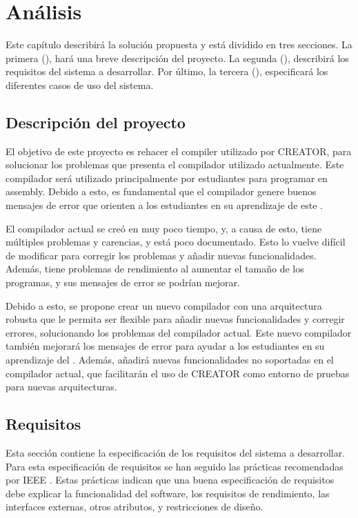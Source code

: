 \chapter{Análisis}\label{chap:analysis}

Este capítulo describirá la solución propuesta y está dividido en tres
secciones. La primera (), hará una breve descripción del
proyecto. La segunda (), describirá los requisitos del
sistema a desarrollar. Por último, la tercera (),
especificará los diferentes casos de uso del sistema.

\section{Descripción del proyecto}\label{sec:description}

El objetivo de este proyecto es rehacer el \gls{compiler} utilizado por CREATOR,
para solucionar los problemas que presenta el compilador utilizado actualmente.
Este compilador será utilizado principalmente por estudiantes para programar en
\gls{assembly}. Debido a esto, es fundamental que el compilador genere buenos
mensajes de error que orienten a los estudiantes en su aprendizaje de este
.

El compilador actual se creó en muy poco tiempo, y, a causa de esto, tiene
múltiples problemas y carencias, y está poco documentado. Esto lo vuelve difícil
de modificar para corregir los problemas y añadir nuevas funcionalidades.
Además, tiene problemas de rendimiento al aumentar el tamaño de los programas,
y sus mensajes de error se podrían mejorar.

Debido a esto, se propone crear un nuevo compilador con una arquitectura robusta
que le permita ser flexible para añadir nuevas funcionalidades y corregir
errores, solucionando los problemas del compilador actual. Este nuevo compilador
también mejorará los mensajes de error para ayudar a los estudiantes en su
aprendizaje del . Además, añadirá nuevas
funcionalidades no soportadas en el compilador actual, que facilitarán el uso de
CREATOR como entorno de pruebas para nuevas arquitecturas.

\section{Requisitos}\label{sec:requirements}

Esta sección contiene la especificación de los requisitos del sistema a
desarrollar. Para esta especificación de requisitos se han seguido las prácticas
recomendadas por IEEE \parencite{requirementsIEEE}. Estas prácticas indican que
una buena especificación de requisitos debe explicar la funcionalidad del
software, los requisitos de rendimiento, las interfaces externas, otros
atributos, y restricciones de diseño.

